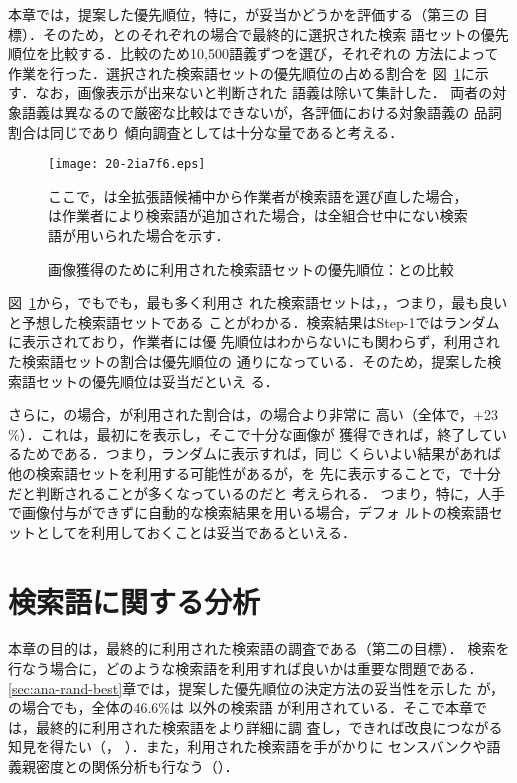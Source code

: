 \documentclass[japanese]{jnlp_1.4}
\newcommand{\best}{}
\newcommand{\evaB}{}
\newcommand{\evaR}{}
\newcommand{\added}{}
\newcommand{\fixed}{}
\newcommand{\sel}{}
\newcommand{\refsec}[1]{}
\begin{document}
本章では，提案した優先順位，特に，\best{}が妥当かどうかを評価する（第三の
目標）．そのため，\evaR{}と\evaB{}のそれぞれの場合で最終的に選択された検索
語セットの優先順位を比較する．比較のため10,500語義ずつを選び，それぞれの
方法によって作業を行った．選択された検索語セットの優先順位の占める割合を
図~\ref{fig:used-query-order}に示す．なお，画像表示が出来ないと判断された
語義は除いて集計した．
両者の対象語義は異なるので厳密な比較はできないが，各評価における対象語義の
品詞割合は同じであり
傾向調査としては十分な量であると考える．

\begin{figure}[b]
\begin{center}
\texttt{[image: 20-2ia7f6.eps]}
\end{center}
\small
ここで，\sel{}は全拡張語候補中から作業者が検索語を選び直した場合，\added{}は作業者により検索語が追加された場合，\fixed{}は全組合せ中にない検索語が用いられた場合を示す．
\vspace{0.5\Cvs}
\caption{画像獲得のために利用された検索語セットの優先順位：\evaR{}と\evaB{}の比較}
\label{fig:used-query-order}
\end{figure}

図~\ref{fig:used-query-order}から，\evaR{}でも\evaB{}でも，最も多く利用さ
れた検索語セットは，\best{}，つまり，最も良いと予想した検索語セットである
ことがわかる．検索結果はStep-1ではランダムに表示されており，作業者には優
先順位はわからないにも関わらず，利用された検索語セットの割合は優先順位の
通りになっている．そのため，提案した検索語セットの優先順位は妥当だといえ
る．

さらに，\evaB{}の場合，\best{}が利用された割合は，\evaR{}の場合より非常に
高い（全体で，+23 \%）．これは，最初に\best{}を表示し，そこで十分な画像が
獲得できれば，終了しているためである．つまり，ランダムに表示すれば，同じ
くらいよい結果があれば他の検索語セットを利用する可能性があるが，\best{}を
先に表示することで，\best{}で十分だと判断されることが多くなっているのだと
考えられる．
つまり，特に，人手で画像付与ができずに自動的な検索結果を用いる場合，デフォ
ルトの検索語セットとして\best{}を利用しておくことは妥当であるといえる．


\section{検索語に関する分析}
\label{sec:all-lxd-analysis}

本章の目的は，最終的に利用された検索語の調査である（第二の目標）．
検索を行なう場合に，どのような検索語を利用すれば良いかは重要な問題である．
\ref{sec:ana-rand-best}章では，提案した優先順位の決定方法の妥当性を示した
が，\evaB{}の場合でも，全体の46.6\%は \best{}以外の検索語
が利用されている．そこで本章では，最終的に利用された検索語をより詳細に調
査し，できれば改良につながる知見を得たい（\refsec{sec:ana-query}，
\refsec{sec:ana-add-fixed}）．また，利用された検索語を手がかりに
センスバンクや語義親密度との関係分析も行なう（\refsec{sec:judge-major}）．
\end{document}
